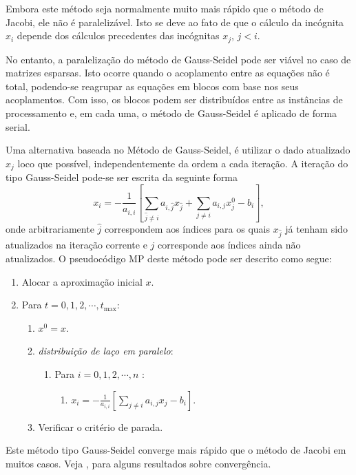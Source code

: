 Embora este método seja normalmente muito mais rápido que o método de Jacobi, ele não é paralelizável. Isto se deve ao fato de que o cálculo da incógnita $x_i$ depende dos cálculos precedentes das incógnitas $x_j$, $j<i$.

No entanto, a paralelização do método de Gauss-Seidel pode ser viável no caso de matrizes esparsas. Isto ocorre quando o acoplamento entre as equações não é total, podendo-se reagrupar as equações em blocos com base nos seus acoplamentos. Com isso, os blocos podem ser distribuídos entre as instâncias de processamento e, em cada uma, o método de Gauss-Seidel é aplicado de forma serial.

Uma alternativa baseada no Método de Gauss-Seidel, é utilizar o dado atualizado $x_j$ loco que possível, independentemente da ordem a cada iteração. A iteração do tipo Gauss-Seidel pode-se ser escrita da seguinte forma
\begin{equation}
  x_i = -\frac{1}{a_{i,i}}\left[\sum_{\hat{j}\neq i}a_{i,\hat{j}}x_{\hat{j}} + \sum_{j\neq i}a_{i,j}x^0_j - b_i\right],
\end{equation}
onde arbitrariamente $\hat{j}$ correspondem aos índices para os quais $x_{\hat{j}}$ já tenham sido atualizados na iteração corrente e $j$ corresponde aos índices ainda não atualizados. O pseudocódigo MP deste método pode ser descrito como segue:
\begin{enumerate}
\item Alocar a aproximação inicial $x$.
\item Para $t=0,1,2,\cdots,t_{\text{max}}$:
  \begin{enumerate}
  \item $x^0 = x$.
  \item {\it distribuição de laço em paralelo}:
    \begin{enumerate}
    \item Para $i=0,1,2,\cdots,n$ :
    \begin{enumerate}
    \item $\displaystyle x_i = -\frac{1}{a_{i,i}}\left[\sum_{j\neq i}a_{i,j}x_j - b_i\right]$.
    \end{enumerate}
  \end{enumerate}
  \item Verificar o critério de parada.
  \end{enumerate}
\end{enumerate}
Este método tipo Gauss-Seidel converge mais rápido que o método de Jacobi em muitos casos. Veja \cite[p.~151--153]{Bertsekas2015a}, para alguns resultados sobre convergência.



